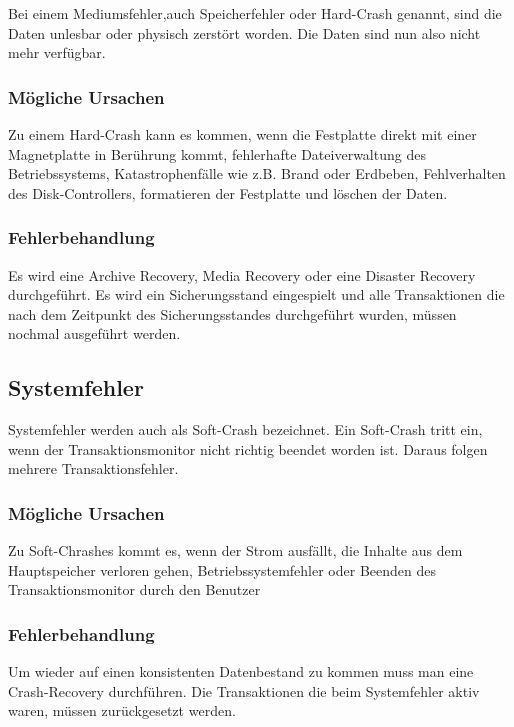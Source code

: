 \begin{flushleft}
Bei einem Mediumsfehler,auch Speicherfehler oder Hard-Crash genannt, sind die Daten unlesbar oder physisch zerstört worden. Die Daten sind nun also nicht mehr verfügbar. 

\subsubsection{Mögliche Ursachen}

Zu einem Hard-Crash kann es kommen, wenn die Festplatte direkt mit einer Magnetplatte in Berührung kommt, fehlerhafte Dateiverwaltung des Betriebssystems, Katastrophenfälle wie z.B. Brand oder Erdbeben, Fehlverhalten des Disk-Controllers, formatieren der Festplatte und löschen der Daten.

\subsubsection{Fehlerbehandlung}

Es wird eine Archive Recovery, Media Recovery oder eine Disaster Recovery durchgeführt.
Es wird ein Sicherungsstand eingespielt und alle Transaktionen die nach dem Zeitpunkt des Sicherungsstandes durchgeführt wurden, müssen nochmal ausgeführt werden.

\subsection{Systemfehler}

Systemfehler werden auch als Soft-Crash bezeichnet. Ein Soft-Crash tritt ein, wenn der Transaktionsmonitor nicht richtig beendet worden ist. Daraus folgen mehrere Transaktionsfehler.

\subsubsection{Mögliche Ursachen}

Zu Soft-Chrashes kommt es, wenn der Strom ausfällt, die Inhalte aus dem Hauptspeicher verloren gehen, Betriebssystemfehler oder Beenden des Transaktionsmonitor durch den Benutzer

\subsubsection{Fehlerbehandlung}

Um wieder auf einen konsistenten Datenbestand zu kommen muss man eine Crash-Recovery durchführen. Die Transaktionen die beim Systemfehler aktiv waren, müssen zurückgesetzt werden.


\end{flushleft}
